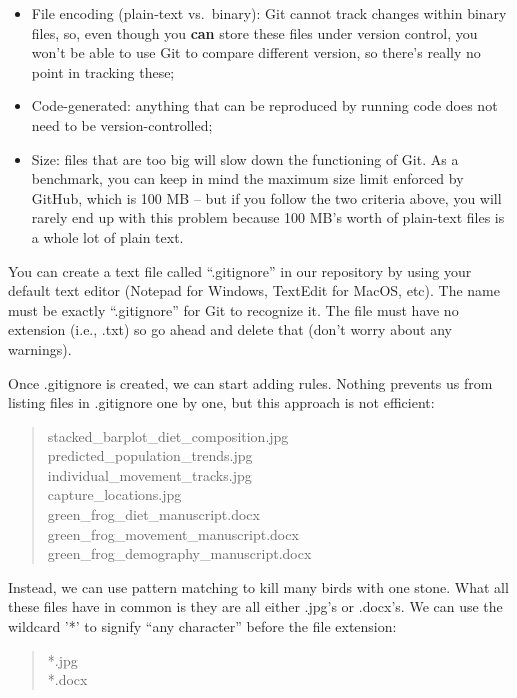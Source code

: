 \documentclass[
]{book}
\providecommand{\tightlist}{%
  \setlength{\itemsep}{0pt}\setlength{\parskip}{0pt}}
\begin{document}
\begin{itemize}
\tightlist
\item
  File encoding (plain-text vs.~binary): Git cannot track changes within binary files, so, even though you \textbf{can} store these files under version control, you won't be able to use Git to compare different version, so there's really no point in tracking these;
\item
  Code-generated: anything that can be reproduced by running code does not need to be version-controlled;
\item
  Size: files that are too big will slow down the functioning of Git. As a benchmark, you can keep in mind the maximum size limit enforced by GitHub, which is 100 MB -- but if you follow the two criteria above, you will rarely end up with this problem because 100 MB's worth of plain-text files is a whole lot of plain text.
\end{itemize}

You can create a text file called ``.gitignore'' in our repository by using your default text editor (Notepad for Windows, TextEdit for MacOS, etc). The name must be exactly ``.gitignore'' for Git to recognize it. The file must have no extension (i.e., .txt) so go ahead and delete that (don't worry about any warnings).

Once .gitignore is created, we can start adding rules. Nothing prevents us from listing files in .gitignore one by one, but this approach is not efficient:

\begin{quote}
stacked\_barplot\_diet\_composition.jpg\\
predicted\_population\_trends.jpg\\
individual\_movement\_tracks.jpg\\
capture\_locations.jpg\\
green\_frog\_diet\_manuscript.docx\\
green\_frog\_movement\_manuscript.docx\\
green\_frog\_demography\_manuscript.docx
\end{quote}

Instead, we can use pattern matching to kill many birds with one stone. What all these files have in common is they are all either .jpg's or .docx's. We can use the wildcard '*' to signify ``any character'' before the file extension:

\begin{quote}
*.jpg\\
*.docx
\end{quote}
\end{document}
